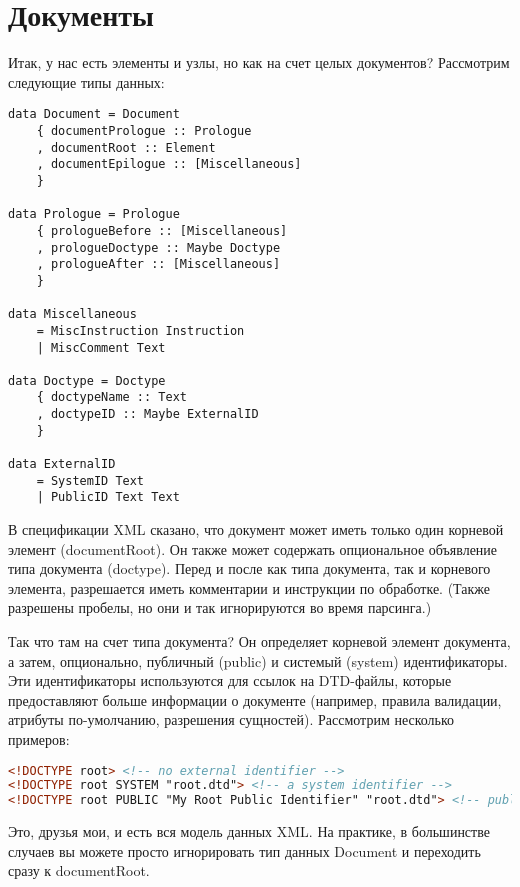 \section{Документы} %

Итак, у нас есть элементы и узлы, но как на счет целых документов? Рассмотрим следующие типы данных:

\begin{lstlisting}
data Document = Document
    { documentPrologue :: Prologue
    , documentRoot :: Element
    , documentEpilogue :: [Miscellaneous]
    }

data Prologue = Prologue
    { prologueBefore :: [Miscellaneous]
    , prologueDoctype :: Maybe Doctype
    , prologueAfter :: [Miscellaneous]
    }

data Miscellaneous
    = MiscInstruction Instruction
    | MiscComment Text

data Doctype = Doctype
    { doctypeName :: Text
    , doctypeID :: Maybe ExternalID
    }

data ExternalID
    = SystemID Text
    | PublicID Text Text
\end{lstlisting}

В спецификации XML сказано, что документ может иметь только один корневой элемент (documentRoot). Он также может содержать опциональное объявление типа документа (doctype). Перед и после как типа документа, так и корневого элемента, разрешается иметь комментарии и инструкции по обработке. (Также разрешены пробелы, но они и так игнорируются во время парсинга.)

Так что там на счет типа документа? Он определяет корневой элемент документа, а затем, опционально, публичный (public) и системый (system) идентификаторы. Эти идентификаторы используются для ссылок на DTD-файлы, которые предоставляют больше информации о документе (например, правила валидации, атрибуты по-умолчанию, разрешения сущностей). Рассмотрим несколько примеров:

\begin{lstlisting}[language=HTML]
<!DOCTYPE root> <!-- no external identifier -->
<!DOCTYPE root SYSTEM "root.dtd"> <!-- a system identifier -->
<!DOCTYPE root PUBLIC "My Root Public Identifier" "root.dtd"> <!-- public identifiers have a system ID as well -->
\end{lstlisting}

Это, друзья мои, и есть вся модель данных XML. На практике, в большинстве случаев вы можете просто игнорировать тип данных Document и переходить сразу к documentRoot.


